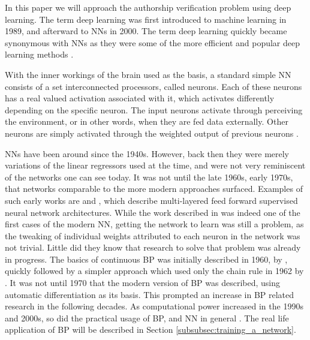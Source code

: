 In this paper we will approach the authorship verification problem using deep
learning. The term deep learning was first introduced to machine learning in
1989, and afterward to \glspl{NN} in 2000. The term deep learning quickly became
synonymous with \glspl{NN} as they were some of the more efficient and popular
deep learning methods \citep{Schmidhuber:2015}.

With the inner workings of the brain used as the basis, a standard simple
\gls{NN} consists of a set interconnected processors, called neurons. Each of
these neurons has a real valued activation associated with it, which activates
differently depending on the specific neuron. The input neurons activate
through perceiving the environment, or in other words, when they are fed data
externally. Other neurons are simply activated through the weighted output of
previous neurons \citep{DBLP:journals/corr/Schmidhuber14}.

\glspl{NN} have been around since the 1940s. However, back then they were
merely variations of the linear regressors used at the time, and were not
very reminiscent of the networks one can see today. It was not until the late
1960s, early 1970s, that networks comparable to the more modern approaches
surfaced. Examples of such early works are \citep{ivakhnenko1973cybernetic} and
\citep{4308320}, which describe multi-layered feed forward supervised neural
network architectures. While the work described in \citep{4308320} was indeed
one of the first cases of the modern \gls{NN}, getting the network to learn was
still a problem, as the tweaking of individual weights attributed to each neuron
in the network was not trivial. Little did they know that research to solve that
problem was already in progress. The basics of continuous \gls{BP} was initially
described in 1960, by \citet{Kelley1960}, quickly followed by a simpler approach
which used only the chain rule in 1962 by \citet{DREYFUS196230}. It was not
until 1970 that the modern version of \gls{BP} was described, using automatic
differentiation as its basis. This prompted an increase in \gls{BP} related
research in the following decades. As computational power increased in the
1990s and 2000s, so did the practical usage of \gls{BP}, and \gls{NN} in
general \citep{Schmidhuber:2015}. The real life application of \gls{BP} will be
described in Section \ref{subsubsec:training_a_network}.

